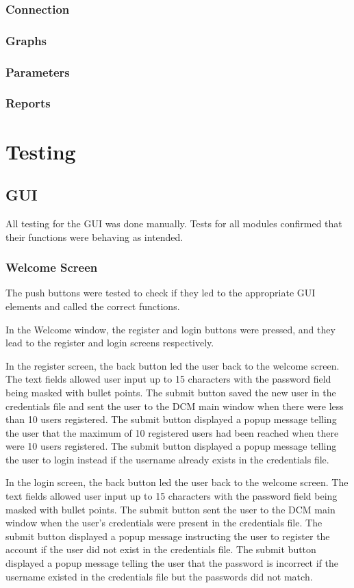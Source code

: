\documentclass[12pt]{article}
\begin{document}
\subsubsection{Connection}
\subsubsection{Graphs}
\subsubsection{Parameters}
\subsubsection{Reports}
\newpage
\section{Testing}
\subsection{GUI}
All testing for the GUI was done manually. Tests for all modules confirmed that their functions were behaving as intended.

\subsubsection{Welcome Screen}
The push buttons were tested to check if they led to the appropriate GUI elements and called the correct functions. 

In the Welcome window, the register and login buttons were pressed, and they lead to the register and login screens respectively. 

In the register screen, the back button led the user back to the welcome screen. The text fields allowed user input up to 15 characters with the password field being masked with bullet points. The submit button saved the new user in the credentials file and sent the user to the DCM main window when there were less than 10 users registered. The submit button displayed a popup message telling the user that the maximum of 10 registered users had been reached when there were 10 users registered. The submit button displayed a popup message telling the user to login instead if the username already exists in the credentials file.

In the login screen, the back button led the user back to the welcome screen. The text fields allowed user input up to 15 characters with the password field being masked with bullet points. The submit button sent the user to the DCM main window when the user's credentials were present in the credentials file. The submit button displayed a popup message instructing the user to register the account if the user did not exist in the credentials file. The submit button displayed a popup message telling the user that the password is incorrect if the username existed in the credentials file but the passwords did not match.
\end{document}
